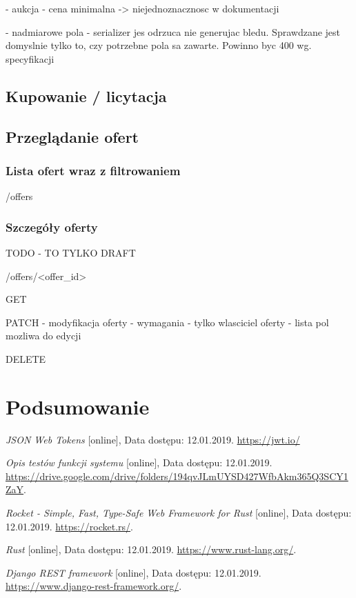 \documentclass[12pt, notitlepage]{article}
\begin{document}
- aukcja - cena minimalna -> niejednoznacznosc w dokumentacji

- nadmiarowe pola - serializer jes odrzuca nie generujac bledu. Sprawdzane jest domyslnie tylko to, czy potrzebne pola sa zawarte. Powinno byc 400 wg. specyfikacji

\subsection{Kupowanie / licytacja}
\subsection{Przeglądanie ofert}
\subsubsection{Lista ofert wraz z filtrowaniem}\label{sec:search}
/offers

\subsubsection{Szczegóły oferty}\label{sec:details}

TODO - TO TYLKO DRAFT

/offers/<offer\_id>

GET

PATCH - modyfikacja oferty
- wymagania - tylko wlasciciel oferty
- lista pol mozliwa do edycji

DELETE


\section{Podsumowanie}

\begin{thebibliography}{9}

\textit{JSON Web Tokens} [online], Data dostępu: 12.01.2019. 
\newline\url{https://jwt.io/}

\textit{Opis testów funkcji systemu} [online], Data dostępu: 12.01.2019. 
\newline\url{https://drive.google.com/drive/folders/194qvJLmUYSD427WfbAkm365Q3SCY1ZaY}.

\textit{Rocket - Simple, Fast, Type-Safe Web Framework for Rust} [online], Data dostępu: 12.01.2019. 
\newline\url{https://rocket.rs/}.

\textit{Rust} [online], Data dostępu: 12.01.2019. 
\newline\url{https://www.rust-lang.org/}.

\textit{Django REST framework} [online], Data dostępu: 12.01.2019. 
\newline\url{https://www.django-rest-framework.org/}.

\end{thebibliography} 
\end{document}
